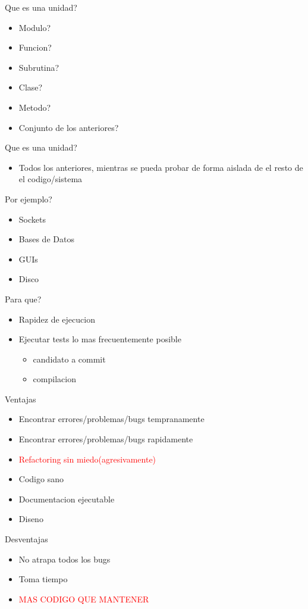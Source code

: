 \begin{frame}{Que es una unidad?}
    \begin{itemize}
        \item Modulo?
        \item Funcion?
        \item Subrutina?
        \item Clase?
        \item Metodo?
        \item Conjunto de los anteriores?
    \end{itemize}
\end{frame}

\begin{frame}{Que es una unidad?}
    \begin{itemize}
        \item Todos los anteriores, mientras se pueda probar de forma aislada de el resto de el codigo/sistema
    \end{itemize}
\end{frame}

\begin{frame}{Por ejemplo?}
    \begin{itemize}
        \item Sockets
        \item Bases de Datos
        \item GUIs
        \item Disco
    \end{itemize}
\end{frame}

\begin{frame}{Para que?}
    \begin{itemize}
        \item Rapidez de ejecucion
        \item Ejecutar tests lo mas frecuentemente posible
        \begin{itemize}
            \item candidato a commit
            \item compilacion
        \end{itemize}
    \end{itemize}
\end{frame}

\begin{frame}{Ventajas}
    \begin{itemize}
        \item Encontrar errores/problemas/bugs tempranamente
        \item Encontrar errores/problemas/bugs rapidamente
        \item \textcolor{red}{Refactoring sin miedo(agresivamente)}
        \item Codigo sano
        \item Documentacion ejecutable
        \item Diseno
    \end{itemize}
\end{frame}

\begin{frame}{Desventajas}
    \begin{itemize}
        \item No atrapa todos los bugs
        \item Toma tiempo
        \item \textcolor{red}{MAS CODIGO QUE MANTENER}
    \end{itemize}
\end{frame}



